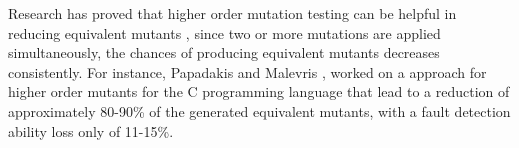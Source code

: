 Research has proved that higher order mutation testing can be helpful in reducing equivalent mutants \cite{jia2009higher,kintis2010evaluating,offutt1992investigations,papadakis2010empirical}, since two or more mutations are applied simultaneously, the chances of producing equivalent mutants decreases consistently. For instance, Papadakis and Malevris \cite{papadakis2010empirical}, worked on a approach for higher order mutants for the C programming language that lead to a reduction of approximately 80-90\% of the generated equivalent mutants, with a fault detection ability loss only of 11-15\%. 



